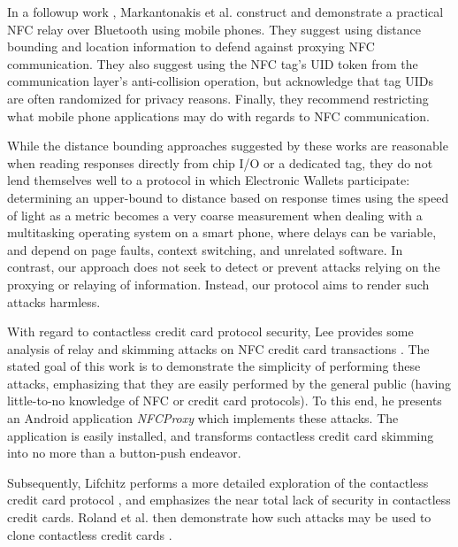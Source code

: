 In a followup work \cite{markantonakis2012practical}, Markantonakis et al. construct and demonstrate a practical NFC relay over Bluetooth using mobile phones.
They suggest using distance bounding and location information to defend against proxying NFC communication.
They also suggest using the NFC tag's UID token from the communication layer's anti-collision operation,
    but acknowledge that tag UIDs are often randomized for privacy reasons.
Finally, they recommend restricting what mobile phone applications may do with regards to NFC communication.

While the distance bounding approaches suggested by these works \cite{francis2010practical, markantonakis2012practical, Drimer:2007:KYE:1362903.1362910}
    are reasonable when reading responses directly from chip I/O or a dedicated tag,
    they do not lend themselves well to a protocol in which Electronic Wallets participate:
determining an upper-bound to distance based on response times using the speed of light as a metric becomes a very coarse measurement
    when dealing with a multitasking operating system on a smart phone, where delays can be variable, and depend on page faults, context switching, and unrelated software.
In contrast, our approach does not seek to detect or prevent attacks relying on the proxying or relaying of information.
Instead, our protocol aims to render such attacks harmless.



With regard to contactless credit card protocol security, Lee provides some analysis of relay and skimming attacks on NFC credit card transactions \cite{lee2012nfc}.
The stated goal of this work is to demonstrate the simplicity of performing these attacks,
    emphasizing that they are easily performed by the general public (having little-to-no knowledge of NFC or credit card protocols).
To this end, he presents an Android application \emph{NFCProxy} \cite{NFCProxy} which implements these attacks.
The application is easily installed, and transforms contactless credit card skimming into no more than a button-push endeavor.

Subsequently, Lifchitz performs a more detailed exploration of the contactless credit card protocol \cite{lifchitz2012hacking},
    and emphasizes the near total lack of security in contactless credit cards.
Roland et al. then demonstrate how such attacks may be used to clone contactless credit cards \cite{roland2013cloning}.


